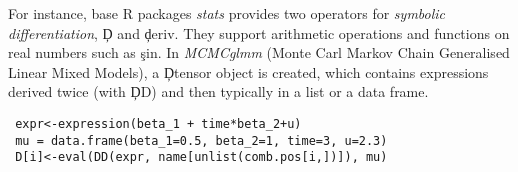 \documentclass[review,screen,acmsmall,anonymous=true]{acmart}
\begin{document}
For instance, base R packages \emph{stats} provides two operators for \emph{symbolic differentiation}, \c{D} and \c{deriv}. They support arithmetic operations and functions on real numbers such as \c{sin}.
In \emph{MCMCglmm} (Monte Carl Markov Chain Generalised Linear Mixed Models), a \c{Dtensor} object is created, which contains expressions derived twice (with \c{DD}) and then typically in a list or a data frame.
\begin{lstlisting}
 expr<-expression(beta_1 + time*beta_2+u)
 mu = data.frame(beta_1=0.5, beta_2=1, time=3, u=2.3)
 D[i]<-eval(DD(expr, name[unlist(comb.pos[i,])]), mu)
\end{lstlisting}




\end{document}
